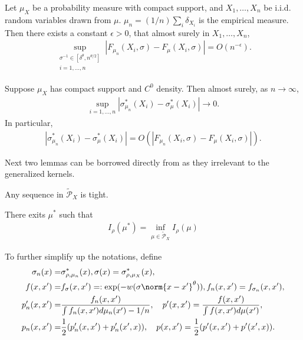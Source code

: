 \begin{proposition} \label{tsne:uniform_convergence_prop}
    Let $\mu_X$ be a probability measure with compact support, and $X_1,\dots,X_n$ be i.i.d. random variables drawn from $\mu$. $\mu_n = (1/n)\sum_i \delta_{X_i}$ is the empirical measure. Then there exists a constant $\epsilon>0$, that almost surely in $X_1,\dots,X_n$,
    \begin{align}
        \sup_{\substack{\sigma^{-1} \in [\delta^{\theta},n^{\theta/2}] \\ i = 1,\dots, n}} \left|F_{\mu_n}(X_i,\sigma)-F_{\mu}(X_i,\sigma)\right| = O(n^{-\epsilon}).
    \end{align}
\end{proposition}
\begin{proposition} \label{tsne:uniform_convergence_prop_2}
    Suppose $\mu_X$ has compact support and $C^0$ density. Then almost surely, as $n \to \infty$,
    \begin{align}
        \sup_{i=1,\dots,n} \left|\sigma_{\mu_n}^*(X_i)-\sigma_{\mu}^*(X_i)\right| \to 0.
    \end{align}
    In particular,
    \begin{align}
        \left|\sigma_{\mu_n}^*(X_i)-\sigma_{\mu}^*(X_i)\right| = O\left(\left|F_{\mu_n}(X_i,\sigma)-F_{\mu}(X_i,\sigma)\right|\right).
    \end{align}
\end{proposition}
Next two lemmas can be borrowed directly from \cite{auffinger-tsne} as they irrelevant to the generalized kernels.
\begin{lemma}
    Any sequence in $\tilde{\mathcal{P}}_X$ is tight.
\end{lemma}
\begin{lemma} \label{mu_star_lemma}
    There exits $\mu^*$ such that
    \begin{align}
        I_{\rho}(\mu^*) = \inf_{\mu \in \tilde{\mathcal{P}}_X} I_{\rho}(\mu)
    \end{align}
\end{lemma}
To further simplify up the notations, define
\begin{align} \label{tsne:convergence_lemmas:notation}
    \sigma_n(x) = &\sigma_{\rho,\mu_n}^*(x), \sigma(x) = \sigma_{\rho,\mu_X}^*(x), \nonumber  \\
    f(x,x') = &f_{\sigma}(x,x') =: \exp(-w(\sigma\norm{x-x'}^{\theta})), f_n(x,x') =  f_{\sigma_n}(x,x'), \nonumber \\
    p'_n(x,x') =  & \frac{f_n(x,x')}{\int f_n(x,x')d\mu_n(x') - 1/n}, \quad p'(x,x') = \frac{f(x,x')}{\int f(x,x')d\mu(x')}, \nonumber \\
    p_n(x,x') =   & \frac{1}{2}(p'_n(x,x')+p'_n(x',x)), \quad p(x,x') = \frac{1}{2}(p'(x,x')+p'(x',x)).
\end{align}
